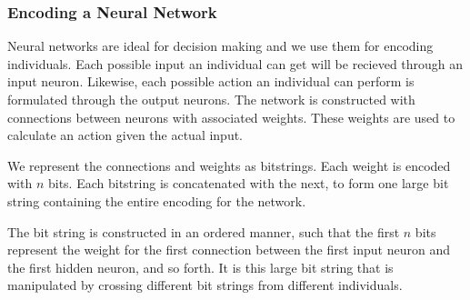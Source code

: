 \subsubsection{Encoding a Neural Network}


Neural networks are ideal for decision making and we use them for encoding individuals. Each possible input an individual can get will be recieved through an input neuron. Likewise, each possible action an individual can perform is formulated through the output neurons. The network is constructed with connections between neurons with associated weights. These weights are used to calculate an action given the actual input.

We represent the connections and weights as bitstrings. Each weight is encoded with $n$ bits. Each bitstring is concatenated with the next, to form one large bit string containing the entire encoding for the network.

The bit string is constructed in an ordered manner, such that the first $n$ bits represent the weight for the first connection between the first input neuron and the first hidden neuron, and so forth. It is this large bit string that is manipulated by crossing different bit strings from different individuals.



